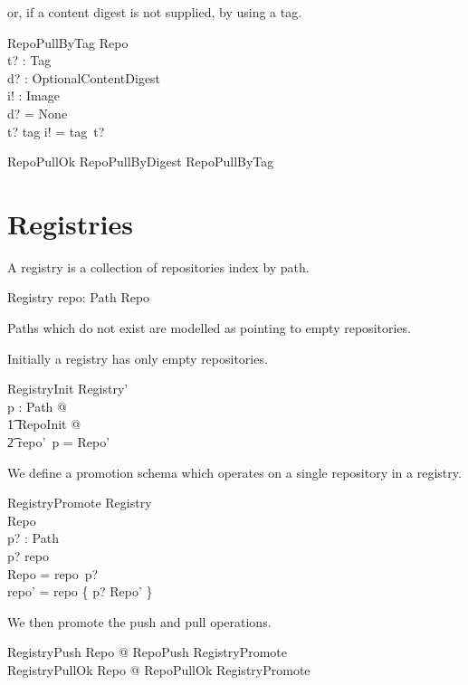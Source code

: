 \documentclass[a4paper,twoside,12pt]{article}
\begin{document}
or, if a content digest is not supplied, by using a tag.
\begin{schema}{RepoPullByTag}
  \Xi Repo \\
  t? : Tag \\
  d? : OptionalContentDigest \\
  i! : Image \\
\where
  d? = None \\
  t? \in \dom tag \implies i! = tag~t? \\
\end{schema}

\begin{zed}
  RepoPullOk  RepoPullByDigest \lor RepoPullByTag
\end{zed}

\newpage
\section{Registries}

A registry is a collection of repositories index by path.
\begin{schema}{Registry}
    repo: Path \fun Repo \\
\end{schema}
Paths which do not exist are modelled as pointing to empty repositories.

Initially a registry has only empty repositories.
\begin{schema}{RegistryInit}
  Registry' \\
\where
  \forall p : Path @ \\
  \t1 \exists RepoInit @ \\
  \t2 repo'~p = \theta Repo' \\
\end{schema}

We define a promotion schema which operates on a single repository in a registry.
\begin{schema}{RegistryPromote}
  \Delta Registry \\
  \Delta Repo \\
  p? : Path \\
\where
  p? \in \dom repo \\
  \theta Repo = repo~p? \\
  repo' = repo \oplus \{ p? \mapsto \theta Repo' \} \\
\end{schema}

We then promote the push and pull operations.
\begin{zed}
  RegistryPush  \exists \Delta Repo @ RepoPush \land RegistryPromote \\
  RegistryPullOk  \exists \Delta Repo @ RepoPullOk \land RegistryPromote \\
\end{zed}
  
\end{document}
